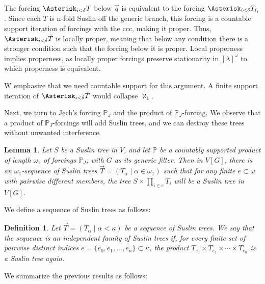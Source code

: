 \documentclass[a4paper,11pt]{article}
\newtheorem{lemma}[theorem]{Lemma}
\newtheorem{definition}[theorem]{Definition}
\newcommand{\forceP}{\mathbb{P}}
\begin{document}
The forcing \( \Asterisk_{i < \delta} T \) below \( \vec{q} \) is equivalent to the forcing \( \Asterisk_{i < \delta} T_{\dot{t}_i} \). Since each \( T \) is n-fold Suslin off the generic branch, this forcing is a countable support iteration of forcings with the ccc, making it proper. Thus, \( \Asterisk_{i < \delta} \check{T} \) is locally proper, meaning that below any condition there is a stronger condition such that the forcing below it is proper. Local properness implies properness, as locally proper forcings preserve stationarity in $[\lambda]^{\omega}$ to which properness is equivalent.

W emphasize that we need countable support for this argument. A finite support iteration of \( \Asterisk_{i < \delta} \check{T} \) would collapse \( \aleph_1 \).



Next, we turn to Jech’s forcing \( \forceP_J \) and the product of \( \forceP_J \)-forcing. We observe that a product of \( \forceP_J \)-forcings will add Suslin trees, and we can destroy these trees without unwanted interference.

\begin{lemma}\label{ManySuslinTrees}
Let \( S \) be a Suslin tree in \( V \), and let \( \forceP \) be a countably supported product of length \( \omega_1 \) of forcings \( \forceP_J \), with \( G \) as its generic filter. Then in \( V[G] \), there is an \( \omega_1 \)-sequence of Suslin trees \( \vec{T} = (T_{\alpha} \mid \alpha \in \omega_1) \) such that for any finite \( e \subset \omega \) with pairwise different members, the tree \( S \times \prod_{i \in e} T_i \) will be a Suslin tree in \( V[G] \).
\end{lemma}



We define a sequence of Suslin trees as follows:

\begin{definition}
Let \( \vec{T} = (T_{\alpha} \mid \alpha < \kappa) \) be a sequence of Suslin trees. We say that the sequence is an \emph{independent family of Suslin trees} if, for every finite set of pairwise distinct indices \( e = \{ e_0, e_1, \dots, e_n \} \subset \kappa \), the product \( T_{e_0} \times T_{e_1} \times \cdots \times T_{e_n} \) is a Suslin tree again.
\end{definition}



We summarize the previous results as follows:
\end{document}
